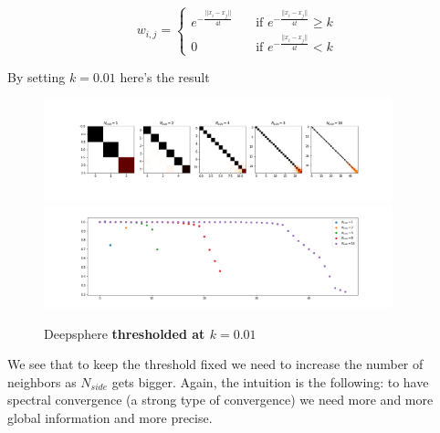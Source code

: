 $$w_{i,j} = \begin{cases}
e^{-\frac{||x_i-x_j||}{4t}}\quad& \text{if } e^{-\frac{||x_i-x_j||}{4t}} \geq k\\
0 \quad & \text{if } e^{-\frac{||x_i-x_j||}{4t}} < k
\end{cases}$$

By setting $k = 0.01$ here's the result

\begin{figure}[h]
	\label{fig:DeepSphere_thresholded}
	\caption{Deepsphere \textbf{thresholded at $k=0.01$}}
	\centering
	\includegraphics[width=0.9\textwidth]{../codes/06_figures/deepsphere_thresholded.png}	
	\includegraphics[width=0.9\textwidth]{../codes/06_figures/deepsphere_thresholded_diagonal.png}	
\end{figure}

We see that to keep the threshold fixed we need to increase the number of neighbors as $N_{side}$ gets bigger. Again, the intuition is the following: to have spectral convergence (a strong type of convergence) we need more and more global information and more precise.
